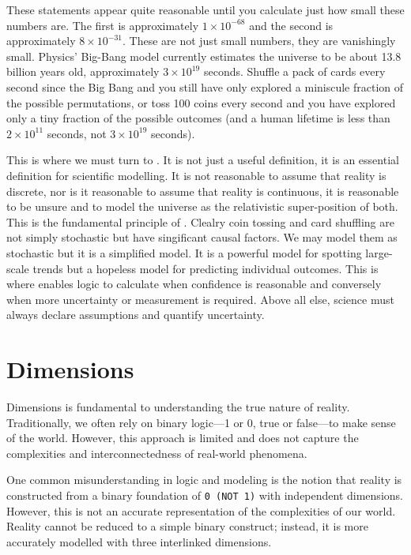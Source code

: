 \documentclass[12pt]{article}
\begin{document}
These statements appear quite reasonable until you calculate just how small these numbers are. The first is approximately $1 \times 10^{-68}$ and the second is approximately $8 \times 10^{-31}$. These are not just small numbers, they are vanishingly small. Physics' Big-Bang model currently estimates the universe to be about 13.8 billion years old, approximately $3 \times 10^{19}$ seconds. Shuffle a pack of cards every second since the Big Bang and you still have only explored a miniscule fraction of the possible permutations, or toss 100 coins every second and you have explored only a tiny fraction of the possible outcomes (and a human lifetime is less than $2 \times 10^{11}$ seconds, not $3 \times 10^{19}$ seconds).

This is where we must turn to \qbit{}. It is not just a useful definition, it is an essential definition for scientific modelling. It is not reasonable to assume that reality is discrete, nor is it reasonable to assume that reality is continuous, it is reasonable to be unsure and to model the universe as the relativistic super-position of both. This is the fundamental principle of \iR{}. Clealry coin tossing and card shuffling are not simply stochastic but have singificant causal factors. We may model them as stochastic but it is a simplified model. It is a powerful model for spotting large-scale trends but a hopeless model for predicting individual outcomes. This is where \qbit{} enables logic to calculate when confidence is reasonable and conversely when more uncertainty or measurement is required. Above all else, science must always declare assumptions and quantify uncertainty.

\section*{\iR{} Dimensions}

\iR{} Dimensions is fundamental to understanding the true nature of reality. Traditionally, we often rely on binary logic—1 or 0, true or false—to make sense of the world. However, this approach is limited and does not capture the complexities and interconnectedness of real-world phenomena.

One common misunderstanding in logic and modeling is the notion that reality is constructed from a binary foundation of \texttt{0 (NOT 1)} with independent dimensions. However, this is not an accurate representation of the complexities of our world. Reality cannot be reduced to a simple binary construct; instead, it is more accurately modelled with three interlinked dimensions.
\end{document}
